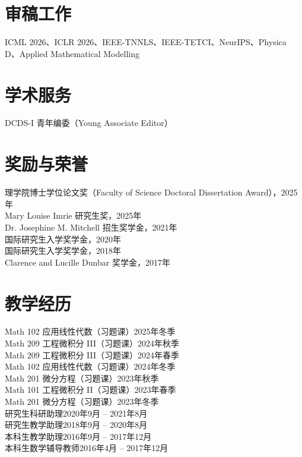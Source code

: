 \documentclass[margin]{res}
\begin{document}
\begin{resume}
\section{审稿工作}

ICML 2026、ICLR 2026、IEEE-TNNLS、IEEE-TETCI、NeurIPS、Physica D、Applied Mathematical Modelling

\section{学术服务}

DCDS-I 青年编委（Young Associate Editor）

\section{奖励与荣誉}

\textbullet{} 理学院博士学位论文奖（Faculty of Science Doctoral Dissertation Award），2025年\\
\textbullet{} Mary Louise Imrie 研究生奖，2025年\\
\textbullet{} Dr. Josephine M. Mitchell 招生奖学金，2021年\\
\textbullet{} 国际研究生入学奖学金，2020年\\
\textbullet{} 国际研究生入学奖学金，2018年\\
\textbullet{} Clarence and Lucille Dunbar 奖学金，2017年

\section{教学经历}

Math 102 应用线性代数（习题课）\hfill 2025年冬季\\
Math 209 工程微积分 III（习题课）\hfill 2024年秋季\\
Math 209 工程微积分 III（习题课）\hfill 2024年春季\\
Math 102 应用线性代数（习题课）\hfill 2024年冬季\\
Math 201 微分方程（习题课）\hfill 2023年秋季\\
Math 101 工程微积分 II（习题课）\hfill 2023年春季\\
Math 201 微分方程（习题课）\hfill 2023年冬季\\
研究生科研助理\hfill 2020年9月 -- 2021年8月\\
研究生教学助理\hfill 2018年9月 -- 2020年8月\\
本科生教学助理\hfill 2016年9月 -- 2017年12月\\
本科生数学辅导教师\hfill 2016年4月 -- 2017年12月

\end{resume}
\end{document}
